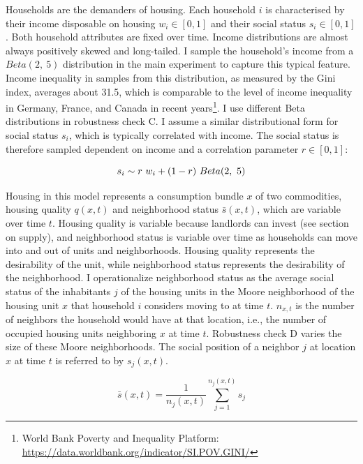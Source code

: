 \documentclass[a4paper,12pt]{article}
\begin{document}
Households are the demanders of housing. Each household $i$ is characterised by their income disposable on housing $w_i \in [0, 1]$ and their social status $s_i \in [0, 1]$. Both household attributes are fixed over time. Income distributions are almost always positively skewed and long-tailed. I sample the household's income from a $Beta(2, \ 5)$ distribution in the main experiment to capture this typical feature. Income inequality in samples from this distribution, as measured by the Gini index, averages about 31.5, which is comparable to the level of income inequality in Germany, France, and Canada in recent years\footnote{World Bank Poverty and Inequality Platform: \url{https://data.worldbank.org/indicator/SI.POV.GINI/}}. I use different Beta distributions in robustness check C. I assume a similar distributional form for social status $s_i$, which is typically correlated with income. The social status is therefore sampled dependent on income and a correlation parameter $r \in [0, 1]$: 

\begin{equation}
 s_i \sim r \ w_i \\ + \\ (1 - r) \ Beta(2, \ 5)
\end{equation}
\label{eq:soc}

Housing in this model represents a consumption bundle $x$ of two commodities, housing quality $q(x, t)$ and neighborhood status $\bar{s}(x, t)$, which are variable over time $t$. Housing quality is variable because landlords can invest (see section on supply), and neighborhood status is variable over time as households can move into and out of units and neighborhoods. Housing quality represents the desirability of the unit, while neighborhood status represents the desirability of the neighborhood. I operationalize neighborhood status as the average social status of the inhabitants $j$ of the housing units in the Moore neighborhood of the housing unit $x$ that household $i$ considers moving to at time $t$. $n_{x, t}$ is the number of neighbors the household would have at that location, i.e., the number of occupied housing units neighboring $x$ at time $t$. Robustness check D varies the size of these Moore neighborhoods. The social position of a neighbor $j$ at location $x$ at time $t$ is referred to by $s_{j}(x, t)$. 

\begin{equation}
 \bar{s}(x, t) = \frac{1}{n_{j}(x, t)} \sum_{j = 1}^{n_{j}(x, t)} s_{j}
\end{equation}
\label{eq:status}
\end{document}
